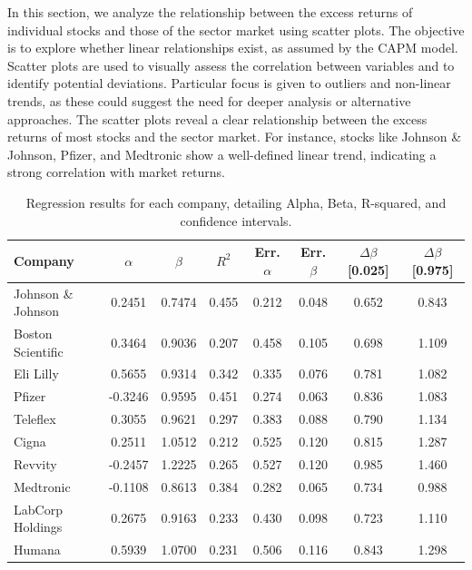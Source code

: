 In this section, we analyze the relationship between the excess returns of individual stocks and those of the sector market
using scatter plots.
The objective is to explore whether linear relationships exist, as assumed by the CAPM model. 
Scatter plots are used to visually assess the correlation between variables and to identify potential deviations.
Particular focus is given to outliers and non-linear trends, as these could suggest the need for deeper analysis or
alternative approaches.
The scatter plots reveal a clear relationship between the excess returns of most stocks and the sector market.
For instance, stocks like Johnson \& Johnson, Pfizer, and Medtronic show a well-defined linear trend, indicating a strong 
correlation with market returns. 

\begin{table}[htbp]
    \centering
    \footnotesize
    \renewcommand{\arraystretch}{1.2} %
    \begin{tabular}{|l|c|c|c|c|c|c|c|}
        \hline
        \rowcolor{unired!30} \textbf{Company} & \textbf{$\alpha$} & \textbf{$\beta$} & \textbf{$R^2$} & \textbf{Err. $\alpha$} & \textbf{Err. $\beta$} & \textbf{$\Delta \beta$ [0.025]} & \textbf{$\Delta \beta$ [0.975]} \\ \hline
        Johnson \& Johnson & 0.2451 & 0.7474 & 0.455 & 0.212 & 0.048 & 0.652 & 0.843 \\ \hline
        \rowcolor{gray!10} Boston Scientific & 0.3464 & 0.9036 & 0.207 & 0.458 & 0.105 & 0.698 & 1.109 \\ \hline
        Eli Lilly & 0.5655 & 0.9314 & 0.342 & 0.335 & 0.076 & 0.781 & 1.082 \\ \hline
        \rowcolor{gray!10} Pfizer & -0.3246 & 0.9595 & 0.451 & 0.274 & 0.063 & 0.836 & 1.083 \\ \hline
        Teleflex & 0.3055 & 0.9621 & 0.297 & 0.383 & 0.088 & 0.790 & 1.134 \\ \hline
        \rowcolor{gray!10} Cigna & 0.2511 & 1.0512 & 0.212 & 0.525 & 0.120 & 0.815 & 1.287 \\ \hline
        Revvity & -0.2457 & 1.2225 & 0.265 & 0.527 & 0.120 & 0.985 & 1.460 \\ \hline
        \rowcolor{gray!10} Medtronic & -0.1108 & 0.8613 & 0.384 & 0.282 & 0.065 & 0.734 & 0.988 \\ \hline
        LabCorp Holdings & 0.2675 & 0.9163 & 0.233 & 0.430 & 0.098 & 0.723 & 1.110 \\ \hline
        \rowcolor{gray!10} Humana & 0.5939 & 1.0700 & 0.231 & 0.506 & 0.116 & 0.843 & 1.298 \\ \hline
    \end{tabular}
    \caption{Regression results for each company, detailing Alpha, Beta, R-squared, and confidence intervals.}
    \label{tab:regression_results}
\end{table}

